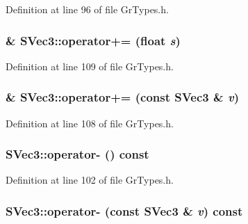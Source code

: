 Definition at line 96 of file GrTypes.h.\hypertarget{struct_s_vec3_907316ea6880e4b6c5816929d8f387f3}{
\subsubsection[{operator+=}]{\& SVec3::operator+= (float {\em s})}}
\label{struct_s_vec3_907316ea6880e4b6c5816929d8f387f3}




Definition at line 109 of file GrTypes.h.\hypertarget{struct_s_vec3_1b2eb0d4a1f7616b3cbf3174fe4a7bcc}{
\subsubsection[{operator+=}]{\& SVec3::operator+= (const {\bf SVec3} \& {\em v})}}
\label{struct_s_vec3_1b2eb0d4a1f7616b3cbf3174fe4a7bcc}




Definition at line 108 of file GrTypes.h.\hypertarget{struct_s_vec3_0e2409af1f979a0253beebf4fdb65569}{
\subsubsection[{operator-}]{ SVec3::operator- () const}}
\label{struct_s_vec3_0e2409af1f979a0253beebf4fdb65569}




Definition at line 102 of file GrTypes.h.\hypertarget{struct_s_vec3_44a8977587b6d371890878767c5fe1e0}{
\subsubsection[{operator-}]{ SVec3::operator- (const {\bf SVec3} \& {\em v}) const}}
\label{struct_s_vec3_44a8977587b6d371890878767c5fe1e0}




